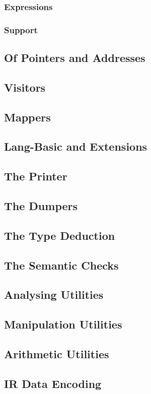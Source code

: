 \subsubsection{Expressions}
\subsubsection{Support}

\subsection{Of Pointers and Addresses}
\subsection{Visitors}
\subsection{Mappers}
\subsection{Lang-Basic and Extensions}
\subsection{The Printer}
\subsection{The Dumpers}
\subsection{The Type Deduction}
\subsection{The Semantic Checks}
\subsection{Analysing Utilities}
\subsection{Manipulation Utilities}
\subsection{Arithmetic Utilities}
\subsection{IR Data Encoding}
